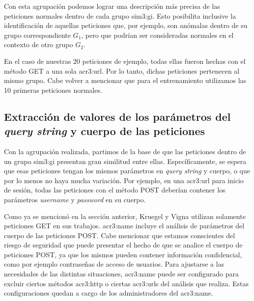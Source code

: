 Con esta agrupación podemos lograr una descripción más precisa de las
peticiones normales dentro de cada grupo \gls{sim3:gi}. Esto posibilita
inclusive la identificación de aquellas peticiones que, por ejemplo, son
anómalas dentro de su grupo correspondiente $G_{1}$, pero que podrían ser
consideradas normales en el contexto de otro grupo $G_{2}$.

En el caso de nuestras 20 peticiones de ejemplo, todas ellas fueron hechas
con el método GET a una sola \gls{acr3:url}. Por lo tanto, dichas peticiones
pertenecen al mismo grupo. Cabe volver a mencionar que para el entrenamiento
utilizamos las 10 primeras peticiones normales.


\subsection{Extracción de valores de los parámetros del \textit{query string}
    y cuerpo de las peticiones}

Con la agrupación realizada, partimos de la base de que las peticiones
dentro de un grupo \gls{sim3:gi} presentan gran similitud entre ellas.
Específicamente, se espera que esas peticiones tengan los mismos parámetros
en \textit{query string} y cuerpo, o que por lo menos no haya mucha
variación. Por ejemplo, en una \gls{acr3:url} para inicio de sesión,
todas las peticiones con el método POST deberían contener los parámetros
\textit{username} y \textit{password} en su cuerpo.

Como ya se mencionó en la sección anterior, Kruegel y Vigna utilizan
solamente peticiones GET en sus trabajos. \gls{acr3:name} incluye el
análisis de parámetros del cuerpo de las peticiones POST.
Cabe mencionar que estamos conscientes del riesgo de seguridad que puede
presentar el hecho de que se analice el cuerpo de peticiones POST, ya
que los mismos pueden contener información confidencial, como por ejemplo
contraseñas de acceso de usuarios. Para ajustarse a las necesidades de
las distintas situaciones, \gls{acr3:name} puede ser configurado para
excluir ciertos métodos \gls{acr3:http} o ciertas \gls{acr3:url}s del
análisis que realiza. Estas configuraciones quedan a cargo de los
administradores del \gls{acr3:name}.

